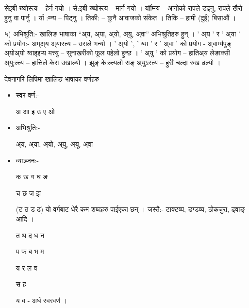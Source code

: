 \documentclass[oldfontcommands,oneside,a4paper,11pt]{article}
\newcommand{\reph}{\vphantom{अ}र्}
\begin{document}
सेइबी ख्योस्त्य –  हेर्न गयो । से:इबी ख्योस्त्य –  मार्न गयो ।
र्याीम्‍न्य – आगोको रापले डढ्‍नु, रापले खैरो हुनु वा पार्नु । र्या :म्‍न्य – पिट्‍नु । 
तिकी: – कुनै आवाजको संकेत । तिकि –  हामी (दुई) बिसाऔं ।

५) अभिश्रुति:- खालिङ भाषाका “अ‌्य, अ्या, अ्यो, अ्यु, अ्वा” अभिश्रुतिहरु हुन् । 
' अ्य ' र ' अ्या ' को प्रयोग:- अम्अ्य अ्यास्त्य – उसले भन्यो ।
' अ्यो ',  ' य्वा '  र  ' अ्वा ' को प्रयोग -  
अ्वार्म्यपुङ् अ्योअ्यो य्वाह्इप्य मत्त्यु – सुनाखरीको फूल पहेलो हुन्छ ।
' अ्यु ' को प्रयोग – 
हातिअ्य लेङाक्सी अ्यु:ल्त्य – हात्तिले केरा उखाल्यो ।
झुङ् के:ल्त्यलो सङ् अ्युऽस्त्य – हुरी चल्दा रुख ढल्यो ।

देवनागरि लिपिमा खालिङ भाषाका वर्णहरु
\begin{itemize}
\item स्वर वर्ण:- 

अ आ इ उ ए ओ 

\item अभिश्रुति:- 

अ्य, अ्या, अ्यो, अ्यु, अ्यू, अ्वा 

\item व्याञ्‍जन:-

क ख ग घ ङ    

च छ ज झ  

(ट ठ ड ढ) यो व\reph{}गबाट धेरै कम शब्दहरु पाईएका छन् । जस्तै:- टाक्टव्य, डग्डव्य, ठोकचुरा, ढ्वाङ् आदि ।
 
त थ द ध न 

प फ ब भ म    

य र ल व    

स  ह

य व - अर्ध स्वरवर्ण ।

\end{itemize}



\setlength\parindent{0cm}
\setlength{\parskip}{-0.5cm}
\end{document}
